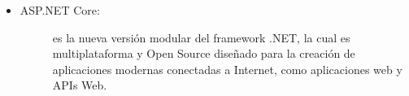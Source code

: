 \begin{itemize}
    \item   \begin{description}
                \item[ASP.NET Core:] es la nueva versión modular del framework .NET, la cual es multiplataforma y Open Source diseñado para la creación de aplicaciones modernas conectadas a Internet, como aplicaciones web y APIs Web.
            \end{description}    
\end{itemize}